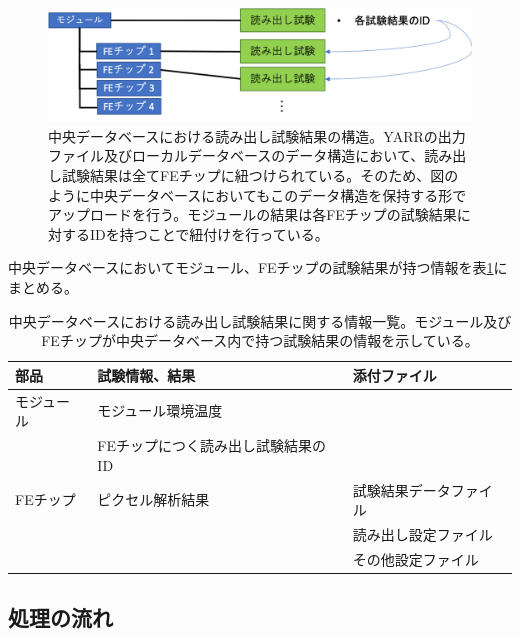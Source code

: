 \begin{figure}[bpt]\centering
  \begin{center}
  \includegraphics[width=13cm]{./structure_for_electrical_tests.png}
  \caption[中央データベースにおける読み出し試験結果の構造]{中央データベースにおける読み出し試験結果の構造。YARRの出力ファイル及びローカルデータベースのデータ構造において、読み出し試験結果は全てFEチップに紐つけられている。そのため、図のように中央データベースにおいてもこのデータ構造を保持する形でアップロードを行う。モジュールの結果は各FEチップの試験結果に対するIDを持つことで紐付けを行っている。}
  \label{structure_for_electrical_tests}
  \end{center}
\end{figure}

中央データベースにおいてモジュール、FEチップの試験結果が持つ情報を表\ref{electrical_parameters}にまとめる。
\begin{table}[tbp]
\begin{center}
\caption[中央データベースにおける読み出し試験結果に関する情報一覧]{中央データベースにおける読み出し試験結果に関する情報一覧。モジュール及びFEチップが中央データベース内で持つ試験結果の情報を示している。}
\label{electrical_parameters}
  \small
  \begin{tabular}{|l|l|l|} \hline
    部品 & 試験情報、結果 & 添付ファイル \\ \hline\hline
    モジュール &  モジュール環境温度 & \\  
               &  FEチップにつく読み出し試験結果のID & \\  \hline
    FEチップ &  ピクセル解析結果 & 試験結果データファイル\\ 
             &                   & 読み出し設定ファイル\\
             &                   & その他設定ファイル\\ \hline 
  \end{tabular}
\end{center}
\end{table}

\subsection{処理の流れ}

